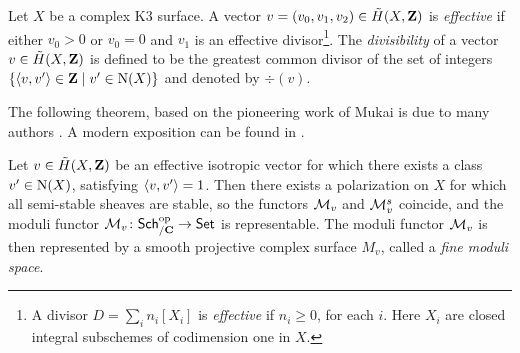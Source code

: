 \begin{definition}
    Let $X$ be a complex K3 surface. A vector $v = (v_0, v_1, v_2) \in \,\tilde{\!{H}}(X, \mathbf Z)$ is \emph{effective} if either $v_0 > 0$ or $v_0 = 0$ and $v_1$ is an effective divisor\footnote{
        A divisor $D = \sum_i n_i[X_i]$ is \emph{effective} if $n_i \geq 0$, for each $i$. Here $X_i$ are closed integral subschemes of codimension one in $X$.
    }. The \emph{divisibility} of a vector $v \in \,\tilde{\!{H}}(X, \mathbf Z)$ is defined to be the greatest common divisor of the set of integers $\{\langle v, v' \rangle \in \mathbf Z \mid v' \in \operatorname{N}(X)\}$ and denoted by $\div(v)$. 
\end{definition}


The following theorem, based on the pioneering work of Mukai \cite{Mukai1987} is due to many authors \cite{GottscheHuybrechts1996,huybrechts2006fouriermukai, OGrady1997}. A modern exposition can be found in \cite{BayerMacri2014}.

\begin{theorem}
    \label{Representability of moduli functor}
    \textsl{\cite{GottscheHuybrechts1996,huybrechts2006fouriermukai, OGrady1997,HuybrechtsLehn2010,BayerMacri2014}}
    Let $v \in \,\tilde{\!{H}}(X, \mathbf Z)$ be an effective isotropic vector for which there exists a class $v' \in \operatorname{N}(X)$, satisfying $\langle v, v' \rangle = 1$. Then there exists a polarization on $X$ for which all semi-stable sheaves are stable, so the functors $\mathcal M_v$ and $\mathcal M^s_v$ coincide, and the moduli functor $\mathcal M_v \colon \mathsf{Sch}_{/\mathbf C}^{\text{op}} \to \mathsf{Set}$ is representable. The moduli functor $\mathcal M_v$ is then represented by a smooth projective complex surface $M_v$, called a \emph{fine moduli space}.
\end{theorem}

